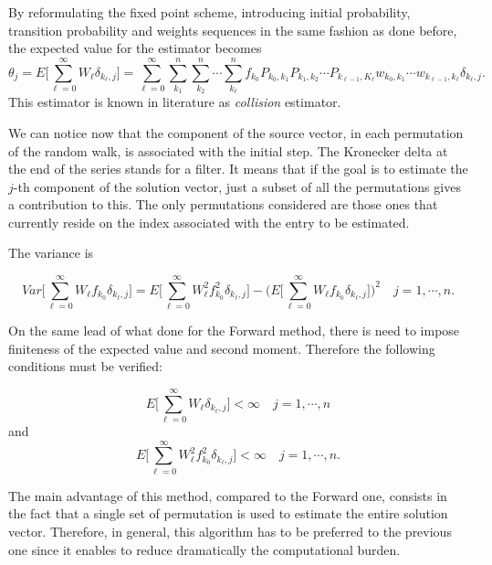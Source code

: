 \documentclass[a4paper,10pt]{article}
\begin{document}
By reformulating the fixed point scheme, introducing initial probability, 
transition probability and weights 
sequences in the same fashion as done before, the expected value for the 
estimator becomes
\begin{equation}
\theta_j=E\bigg[\sum_{\ell=0}^\infty W_{\ell}\delta_{k_{\ell}, 
j}\bigg]=\sum_{\ell=0}^{\infty}\sum_{k_1}^n\sum_{k_2}^n\cdots\sum_{k_{\ell}}^n 
f_{k_0}P_{k_0,k_1}P_{k_1,k_2}\cdots P_{k_{\ell-1},K_{\ell}}w_{k_0,k_1}\cdots 
w_{k_{\ell-1},k_{\ell}}\delta_{k_{\ell},j}.
\label{adj_mean}
\end{equation}
This estimator is known in literature as \textit{collision} estimator.

We can notice now that the component of the source vector, in each 
permutation of the random walk, is associated with the initial step. The 
Kronecker delta 
at the end of the series stands for a filter. It means that if the goal is to 
estimate the $j$-th component of the solution vector, just a subset of all the 
permutations gives a contribution to this. The only permutations considered are 
those ones that currently reside on the index associated with the entry to be 
estimated. 

The variance is 

\begin{equation}
Var\bigg [\sum_{\ell=0}^\infty W_{\ell} 
f_{k_0}\delta_{k_{\ell},j}\bigg]=E\bigg[\sum_{\ell=0}^\infty W_{\ell}^2 
f_{k_0}^2\delta_{k_{\ell},j}\bigg ] - \bigg (E\bigg[\sum_{\ell=0}^\infty 
W_{\ell} 
f_{k_0}\delta_{k_{\ell},j}\bigg]\bigg )^2\quad j=1,\cdots,n
\label{adj_var}.
\end{equation}

On the same lead of what done for the Forward method, there is need to impose 
finiteness of the expected value and second moment. Therefore the following 
conditions must be verified:

\begin{equation}
 E\bigg[\sum_{\ell=0}^\infty W_{\ell}\delta_{k_{\ell}, 
j}\bigg]<\infty \quad j=1,\cdots,n
\end{equation}
and
\begin{equation}
 E\bigg[\sum_{\ell=0}^\infty W_{\ell}^2 
f_{k_0}^2\delta_{k_{\ell},j}\bigg]<\infty \quad j=1,\cdots,n.
\end{equation}

The main advantage of this method, compared to the Forward one, consists in the 
fact that a single set of permutation is used to estimate the entire solution 
vector. Therefore, in general, this algorithm has to be preferred to the 
previous one since it enables to reduce dramatically the computational burden.
\end{document}
